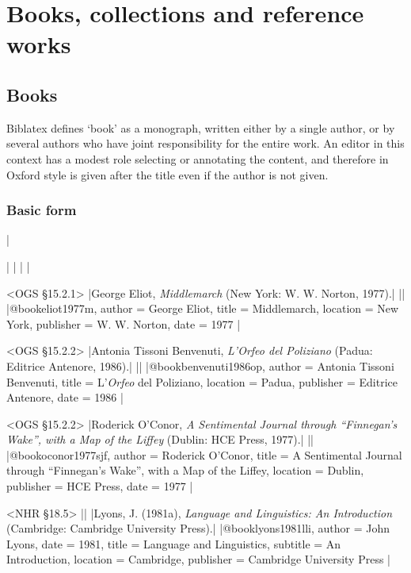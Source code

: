 \documentclass[extrafontsizes,11pt,a4paper,oneside]{memoir}
\newcommand*{\code}[1]{`\textsf{#1}'}
\begin{document}
\chapter{Books, collections and reference works}\label{sec:book}

\section{Books}

Biblatex defines \code{book} as a monograph, written either by a single author, or by several authors who have joint responsibility for the entire work. An editor in this context has a modest role selecting or annotating the content, and therefore in Oxford style is given after the title even if the author is not given.

\subsection{Basic form}
|

\todoc[oxnotes]|
|
\todoc[oxyear]|
|

\bibexample<OGS \S15.2.1>
|George Eliot, \emph{Middlemarch} (New York: W. W. Norton, 1977).|%
||%
|@book{eliot1977m,
  author = {George Eliot},
  title = {Middlemarch},
  location = {New York},
  publisher = {W. W. Norton},
  date = {1977}
}|

\bibexample<OGS \S15.2.2>
|Antonia Tissoni Benvenuti, \emph{L'\emph{Orfeo} del Poliziano} (Padua: Editrice Antenore, 1986).|%
||%
|@book{benvenuti1986op,
  author = {Antonia Tissoni Benvenuti},
  title = {L'\emph{Orfeo} del Poliziano},
  location = {Padua},
  publisher = {Editrice Antenore},
  date = {1986}
}|

\bibexample<OGS \S15.2.2>
|Roderick O'Conor, \emph{A Sentimental Journal through \enquote{Finnegan's Wake}, with a Map of the Liffey} (Dublin: HCE Press, 1977).|%
||%
|@book{oconor1977sjf,
  author = {Roderick O'Conor},
  title = {A Sentimental Journal through \enquote{Finnegan's Wake}, with a Map of the {Liffey}},
  location = {Dublin},
  publisher = {HCE Press},
  date = {1977}
}|

\bibexample<NHR \S18.5>
||%
|Lyons, J. (1981a), \emph{Language and Linguistics: An Introduction} (Cambridge: Cambridge University Press).|%
|@book{lyons1981lli,
  author = {John Lyons},
  date = {1981},
  title = {Language and Linguistics},
  subtitle = {An Introduction},
  location = {Cambridge},
  publisher = {Cambridge University Press}
}|
\end{document}
